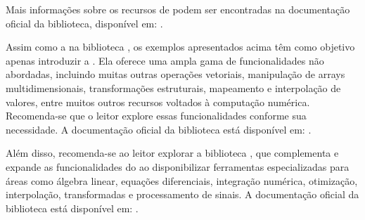 Mais informações sobre os recursos de  podem ser encontradas na documentação oficial da biblioteca,
disponível em: .

Assim como a na biblioteca , os exemplos apresentados acima têm como objetivo apenas introduzir a
.
Ela oferece uma ampla gama de funcionalidades não abordadas, incluindo muitas outras operações vetoriais, manipulação
de arrays multidimensionais, transformações estruturais, mapeamento e interpolação de valores, entre muitos outros
recursos voltados à computação numérica.
Recomenda-se que o leitor explore essas funcionalidades conforme sua necessidade.
A documentação oficial da biblioteca está disponível em: .


Além disso, recomenda-se ao leitor explorar a biblioteca , que complementa e expande as funcionalidades
do  ao disponibilizar ferramentas especializadas para áreas como álgebra linear, equações diferenciais,
integração numérica, otimização, interpolação, transformadas e processamento de sinais.
A documentação oficial da biblioteca está disponível em: .


